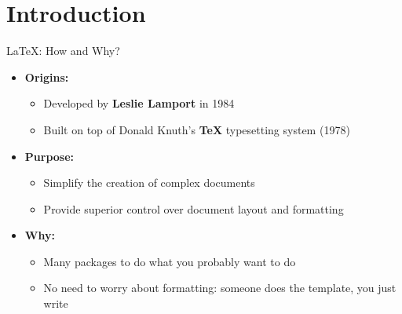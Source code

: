 \documentclass[aspectratio=169]{beamer}
\begin{document}


\section{Introduction}

\begin{frame}{\LaTeX: How and Why?}
    \begin{itemize}
        \item \textbf{Origins:}
            \begin{itemize}
                \item Developed by \textbf{Leslie Lamport} in 1984
                \item Built on top of Donald Knuth's \textbf{TeX} typesetting system (1978)
            \end{itemize}
        \item \textbf{Purpose:}
            \begin{itemize}
                \item Simplify the creation of complex documents
                \item Provide superior control over document layout and formatting
            \end{itemize}
        \item \textbf{Why:}
            \begin{itemize}
                \item Many packages to do what you probably want to do
                \item No need to worry about formatting: someone does the template, you just write
            \end{itemize}
    \end{itemize}
\end{frame}
\end{document}

